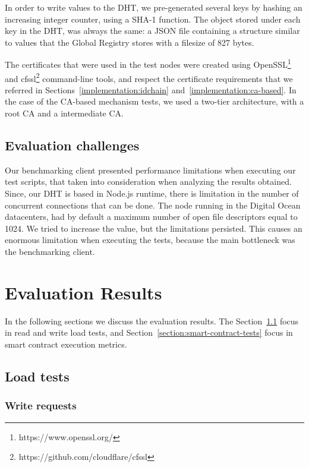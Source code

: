 In order to write values to the DHT, we pre-generated several keys by hashing an increasing integer counter, using a SHA-1 function.
The object stored under each key in the DHT, was always the same: a JSON file containing a structure similar to values that the Global Registry stores with a filesize of 827 bytes.

The certificates that were used in the test nodes were created using OpenSSL\footnote{https://www.openssl.org/} and cfssl\footnote{https://github.com/cloudflare/cfssl} command-line tools, and respect the certificate requirements that we referred in Sections~\ref{implementation:idchain} and~\ref{implementation:ca-based}.
In the case of the CA-based mechanism tests, we used a two-tier architecture, with a root CA and a intermediate CA.

\subsection{Evaluation challenges}

Our benchmarking client presented performance limitations when executing our test scripts, that taken into consideration when analyzing the results obtained.
Since, our DHT is based in Node.js runtime, there is limitation in the number of concurrent connections that can be done.
The node running in the Digital Ocean datacenters, had by default a maximum number of open file descriptors equal to 1024.
We tried to increase the value, but the limitations persisted.
This causes an enormous limitation when executing the tests, because the main bottleneck was the benchmarking client.

\section{Evaluation Results}
\label{section:results}
In the following sections we discuss the evaluation results.
The Section~\ref{section:load-tests} focus in read and write load tests, and Section~\ref{section:smart-contract-tests} focus in smart contract execution metrics.

\subsection{Load tests}
\label{section:load-tests}

\subsubsection{Write requests}

